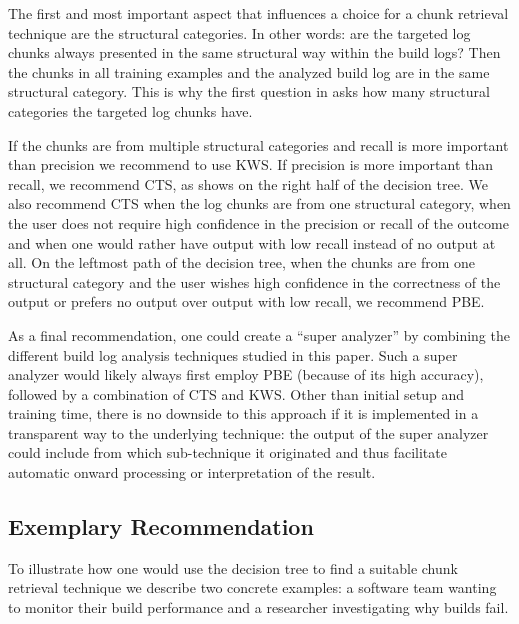 
The first and most important aspect that influences a choice for
a chunk retrieval technique are the structural categories.
In other words:
are the targeted log chunks always presented in
the same structural way within the build logs?
Then the
chunks in all training examples and the analyzed build log are in the
same structural category.
This is why the first question in  asks
how many structural categories the targeted log chunks have.

If the chunks are from multiple structural categories
and recall is more important than precision we recommend
to use KWS\@.
If precision is more important than recall, we
recommend CTS, as  shows on the
right half of the decision tree.
We also recommend CTS when the log chunks are
from one structural category, when the user does not require high
confidence in the precision or recall of the outcome and when one
would rather have output with low recall instead of no output at all.
On the leftmost path of the decision tree,
when the chunks are from one structural category and the user
wishes high confidence in the correctness of the output or prefers
no output over output with low recall, we recommend PBE\@.

As a final recommendation, one could create a ``super analyzer'' by
combining the different build log analysis techniques studied in this
paper.
Such a super analyzer would likely always first employ PBE
(because of its high accuracy), followed by a combination of CTS and
KWS\@.
Other than initial setup and training time, there is no
downside to this approach if it is implemented in a transparent way to
the underlying technique: the output of the super analyzer could
include from which sub-technique it originated and thus facilitate
automatic onward processing or interpretation of the result.


\subsection{Exemplary Recommendation}
To illustrate how one would use the decision tree to find a suitable
chunk retrieval technique we describe two concrete examples: a software
team
wanting to monitor their build performance and a
researcher investigating why builds fail.

